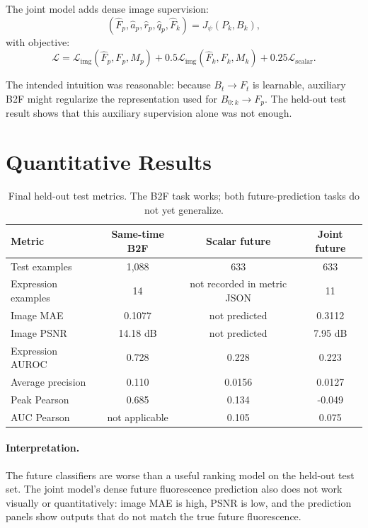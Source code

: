 \documentclass[11pt]{article}
\begin{document}
The joint model adds dense image supervision:
\begin{equation}
(\hat{F}_p,\hat{a}_p,\hat{r}_p,\hat{q}_p,\hat{F}_k)
= J_\psi(P_k, B_k),
\end{equation}
with objective:
\begin{equation}
\mathcal{L}
= \mathcal{L}_{\mathrm{img}}(\hat{F}_p,F_p,M_p)
+0.5\mathcal{L}_{\mathrm{img}}(\hat{F}_k,F_k,M_k)
+0.25\mathcal{L}_{\mathrm{scalar}}.
\end{equation}

The intended intuition was reasonable: because $B_t \rightarrow F_t$ is learnable, auxiliary B2F might regularize the representation used for $B_{0:k} \rightarrow F_p$. The held-out test result shows that this auxiliary supervision alone was not enough.

\section{Quantitative Results}

\begin{table}[H]
\centering
\caption{Final held-out test metrics. The B2F task works; both future-prediction tasks do not yet generalize.}
\begin{tabular}{lccc}
\toprule
Metric & Same-time B2F & Scalar future & Joint future \\
\midrule
Test examples & 1,088 & 633 & 633 \\
Expression examples & 14 & not recorded in metric JSON & 11 \\
Image MAE & 0.1077 & not predicted & 0.3112 \\
Image PSNR & 14.18 dB & not predicted & 7.95 dB \\
Expression AUROC & 0.728 & 0.228 & 0.223 \\
Average precision & 0.110 & 0.0156 & 0.0127 \\
Peak Pearson & 0.685 & 0.134 & -0.049 \\
AUC Pearson & not applicable & 0.105 & 0.075 \\
\bottomrule
\end{tabular}
\end{table}

\paragraph{Interpretation.}
The future classifiers are worse than a useful ranking model on the held-out test set. The joint model's dense future fluorescence prediction also does not work visually or quantitatively: image MAE is high, PSNR is low, and the prediction panels show outputs that do not match the true future fluorescence.
\end{document}
